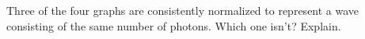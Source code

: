 Three of the four graphs are consistently normalized to represent
a wave consisting of the same number of photons. Which one isn't? Explain.
